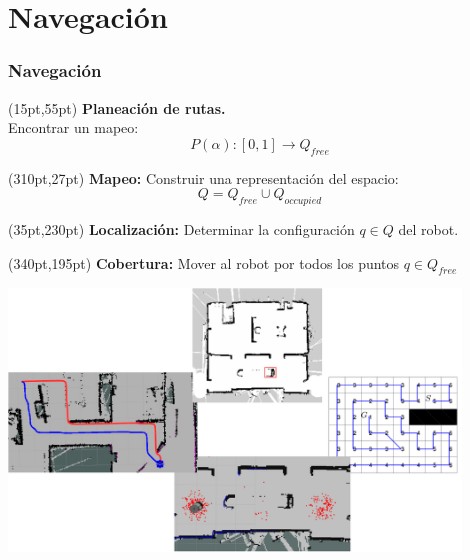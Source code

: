 \documentclass[10pt,spanish,aspectratio=1610]{beamer}
\begin{document}
\section{Navegación}
\begin{frame}\frametitle{Navegación}
  \begin{textblock*}{0.4\textwidth}(15pt,55pt)
    \textbf{ Planeación de rutas. }\\Encontrar un mapeo: 
    \[P(\alpha): [0,1] \rightarrow Q_{free}\]
  \end{textblock*}
  \begin{textblock*}{0.35\textwidth}(310pt,27pt)
    \textbf{Mapeo: }Construir una representación del espacio:
    \[Q = Q_{free} \cup Q_{occupied}\]
  \end{textblock*}
  \begin{textblock*}{0.35\textwidth}(35pt,230pt)
    \textbf{Localización: }Determinar la configuración $q\in Q$ del robot.
  \end{textblock*}
  \begin{textblock*}{0.25\textwidth}(340pt,195pt)
    \textbf{Cobertura: }Mover al robot por todos los puntos $q\in Q_{free}$
  \end{textblock*}
  \centering  \includegraphics[width=0.9\textwidth]{Figures/MotionPlanningProblems.pdf}
\end{frame}
\end{document}
